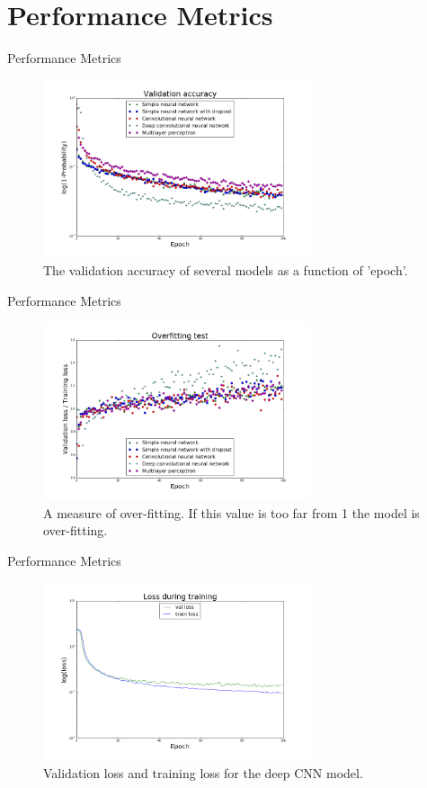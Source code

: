 \section{Performance Metrics}
\begin{frame}[plain]{Performance Metrics}
\begin{figure}
\includegraphics[width = 0.7\textwidth]{log_val_acc}
\caption{The validation accuracy of several models as a function of 'epoch'. }
\end{figure}
\end{frame}

\begin{frame}[plain]{Performance Metrics}
\begin{figure}
\includegraphics[width = 0.7\textwidth]{ratio}
\caption{A measure of over-fitting. If this value is too far from 1 the model is over-fitting.}
\end{figure}
\end{frame}

\begin{frame}[plain]{Performance Metrics}
\begin{figure}
\includegraphics[width = 0.7\textwidth]{cnn_loss}
\caption{Validation loss and training loss for the deep CNN model.}
\end{figure}
\end{frame}

